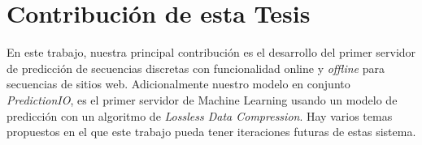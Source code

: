 

\section{Contribución de esta Tesis}


En este trabajo,  nuestra principal contribución es el desarrollo del primer servidor de predicción de secuencias discretas con funcionalidad online y \emph{offline} para secuencias de  sitios web. Adicionalmente nuestro modelo en conjunto \emph{PredictionIO}, es el primer servidor de Machine Learning usando un modelo de predicción con un algoritmo de \emph{Lossless Data Compression}. Hay varios temas propuestos en el que este trabajo pueda tener iteraciones  futuras de estas sistema. 